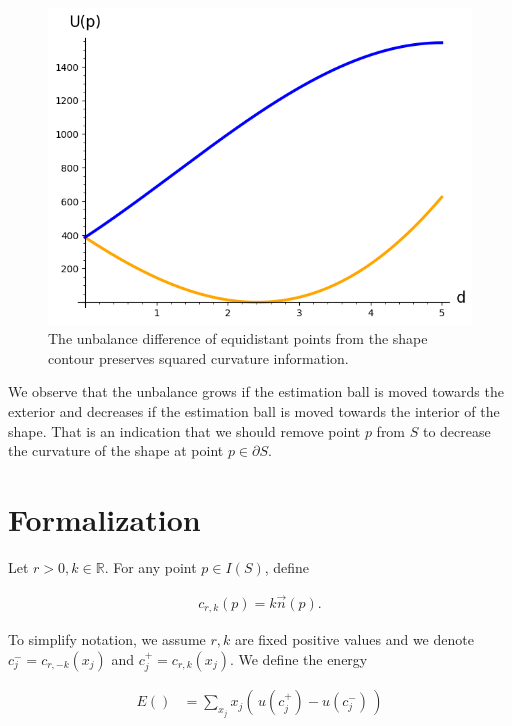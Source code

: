 \begin{figure}[h!]
\begin{minipage}{0.25\textwidth}
\end{minipage}%
\begin{minipage}{0.75\textwidth}
\includegraphics[scale=0.75]{figures/appendix-potential-elastica/potential-elastica-plot.png}
\end{minipage}
\caption{The unbalance difference of equidistant points from the shape contour preserves squared curvature information.}
\label{fig:unbalance-plot}
\end{figure}


We observe that the unbalance grows if the estimation ball is moved towards the exterior and decreases if the estimation ball is moved towards the interior of the shape. That is an indication that we should remove point $p$ from $S$ to decrease the curvature of the shape at point $p \in \partial S$. 


\section{Formalization}

Let $r>0,k \in \mathbb{R}$. For any point $p \in I(S)$, define

\begin{align*}
	c_{r,k}(p) = k\vec{n}(p).
\end{align*}

To simplify notation, we assume $r,k$ are fixed positive values and we denote $c_j^- = c_{r,-k}(x_j)$ and $c_j^+ = c_{r,k}(x_j)$. We define the energy

\begin{align*}
	E() &= \sum_{x_j}{ x_j (\, u(c_j^+) - u(c_j^-)\, )}
\end{align*}

